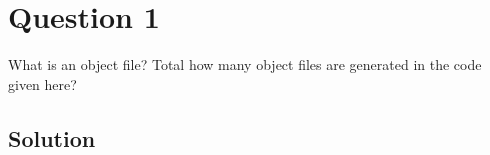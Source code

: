 \section*{Question 1}

What is an object file?
Total how many object files are generated in the code given here?

\subsection*{Solution}
